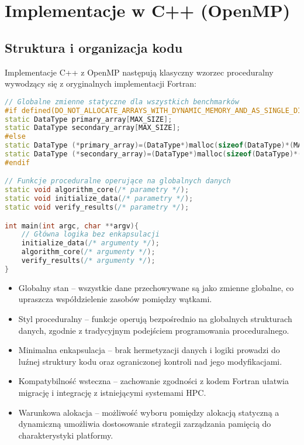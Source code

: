 \section{Implementacje w C++ (OpenMP)}
\subsection{Struktura i organizacja kodu}
Implementacje C++ z OpenMP następują klasyczny wzorzec proceduralny wywodzący się z oryginalnych implementacji Fortran:

\begin{lstlisting}[language=C++, caption={Struktura kodu benchmarków w języku C++ z OpenMP}, label={lst:openmp_structure}]
// Globalne zmienne statyczne dla wszystkich benchmarków
#if defined(DO_NOT_ALLOCATE_ARRAYS_WITH_DYNAMIC_MEMORY_AND_AS_SINGLE_DIMENSION)
static DataType primary_array[MAX_SIZE];
static DataType secondary_array[MAX_SIZE];
#else
static DataType (*primary_array)=(DataType*)malloc(sizeof(DataType)*(MAX_SIZE));
static DataType (*secondary_array)=(DataType*)malloc(sizeof(DataType)*(MAX_SIZE));
#endif

// Funkcje proceduralne operujące na globalnych danych
static void algorithm_core(/* parametry */);
static void initialize_data(/* parametry */);
static void verify_results(/* parametry */);

int main(int argc, char **argv){
    // Główna logika bez enkapsulacji
    initialize_data(/* argumenty */);
    algorithm_core(/* argumenty */);
    verify_results(/* argumenty */);
}
\end{lstlisting}
\begin{itemize}
    \item Globalny stan – wszystkie dane przechowywane są jako zmienne globalne, co upraszcza współdzielenie zasobów pomiędzy wątkami.
    
    \item Styl proceduralny – funkcje operują bezpośrednio na globalnych strukturach danych, zgodnie z tradycyjnym podejściem programowania proceduralnego.
    
    \item Minimalna enkapsulacja – brak hermetyzacji danych i logiki prowadzi do luźnej struktury kodu oraz ograniczonej kontroli nad jego modyfikacjami.
    
    \item Kompatybilność wsteczna – zachowanie zgodności z kodem Fortran ułatwia migrację i integrację z istniejącymi systemami HPC.
    
    \item Warunkowa alokacja – możliwość wyboru pomiędzy alokacją statyczną a dynamiczną umożliwia dostosowanie strategii zarządzania pamięcią do charakterystyki platformy.
\end{itemize}
  
